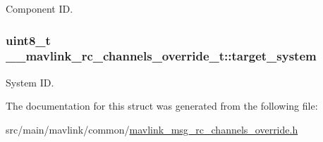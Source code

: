 Component I\+D. 

\hypertarget{struct____mavlink__rc__channels__override__t_a0c5393c94e6462a75244ad5083f310f8}{
\subsubsection[{target\+\_\+system}]{\setlength{\rightskip}{0pt plus 5cm}uint8\+\_\+t \+\_\+\+\_\+mavlink\+\_\+rc\+\_\+channels\+\_\+override\+\_\+t\+::target\+\_\+system}}\label{struct____mavlink__rc__channels__override__t_a0c5393c94e6462a75244ad5083f310f8}


System I\+D. 



The documentation for this struct was generated from the following file\+:\begin{DoxyCompactItemize}
\item 
src/main/mavlink/common/\hyperlink{mavlink__msg__rc__channels__override_8h}{mavlink\+\_\+msg\+\_\+rc\+\_\+channels\+\_\+override.\+h}\end{DoxyCompactItemize}

